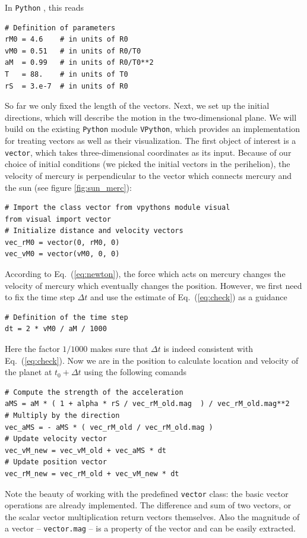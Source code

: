 \documentclass[12pt]{iopart}
\newcommand{\python}[0]{\texttt{Python} }
\begin{document}
In \python, this reads
\begin{lstlisting}
# Definition of parameters
rM0 = 4.6    # in units of R0
vM0 = 0.51   # in units of R0/T0
aM  = 0.99   # in units of R0/T0**2
T   = 88.    # in units of T0
rS  = 3.e-7  # in units of R0
\end{lstlisting}
So far we only fixed the length of the vectors.
Next, we set up the initial directions, which will describe the motion in the two-dimensional plane.  We will build on the existing \python module \texttt{VPython}, which provides  an implementation for treating vectors as well as their visualization.
The first object of interest is a \texttt{vector}, which takes three-dimensional coordinates as its input.  Because of our choice of initial conditions (we picked the initial vectors in the perihelion), the velocity of mercury is perpendicular to the vector which connects mercury and the sun (see figure \ref{fig:sun_merc}):
\begin{lstlisting}
# Import the class vector from vpythons module visual
from visual import vector
# Initialize distance and velocity vectors
vec_rM0 = vector(0, rM0, 0)
vec_vM0 = vector(vM0, 0, 0)
\end{lstlisting}
According to Eq.~(\ref{eq:newton}), the force which acts on mercury changes the velocity of mercury which eventually changes the position. However, we first need to fix the time step $\Delta t$ and use the estimate
of Eq.~(\ref{eq:check}) as a guidance 
\begin{lstlisting}
# Definition of the time step
dt = 2 * vM0 / aM / 1000
\end{lstlisting}
Here the factor $1/1000$ makes sure that $\Delta t$ is indeed consistent with Eq.~(\ref{eq:check}).
%
%
Now we are in the position to calculate
location and velocity of the planet at $t_0+\Delta t$ using the following comands
\begin{lstlisting}
# Compute the strength of the acceleration
aMS = aM * ( 1 + alpha * rS / vec_rM_old.mag  ) / vec_rM_old.mag**2
# Multiply by the direction
vec_aMS = - aMS * ( vec_rM_old / vec_rM_old.mag )
# Update velocity vector
vec_vM_new = vec_vM_old + vec_aMS * dt
# Update position vector
vec_rM_new = vec_rM_old + vec_vM_new * dt
\end{lstlisting}
Note the beauty of working with the predefined \texttt{vector} class: the basic vector operations are already implemented.  The difference and sum of two vectors, or the scalar vector multiplication return vectors themselves.  Also the magnitude of a vector -- \texttt{vector.mag} -- is a property of the vector and can be easily extracted.
\end{document}
